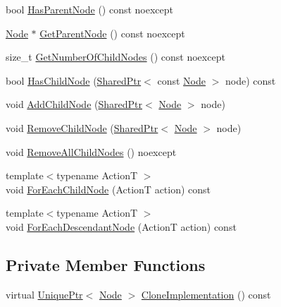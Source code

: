 \begin{DoxyCompactItemize}
\item 
bool \hyperlink{classmage_1_1_node_acc47eb0f2eaa60e71fd945e79b4f622d}{Has\+Parent\+Node} () const noexcept
\item 
\hyperlink{classmage_1_1_node}{Node} $\ast$ \hyperlink{classmage_1_1_node_a21ba704ed3af4c80d096ad5f393da8e0}{Get\+Parent\+Node} () const noexcept
\item 
size\+\_\+t \hyperlink{classmage_1_1_node_ab4fff9779c09d873abcf881b6ff85d9e}{Get\+Number\+Of\+Child\+Nodes} () const noexcept
\item 
bool \hyperlink{classmage_1_1_node_a1b8c2d933a281f7f815791db38c965ad}{Has\+Child\+Node} (\hyperlink{namespacemage_a1e01ae66713838a7a67d30e44c67703e}{Shared\+Ptr}$<$ const \hyperlink{classmage_1_1_node}{Node} $>$ node) const
\item 
void \hyperlink{classmage_1_1_node_a11a7c052c5e4a6713d60aaad67dfde5d}{Add\+Child\+Node} (\hyperlink{namespacemage_a1e01ae66713838a7a67d30e44c67703e}{Shared\+Ptr}$<$ \hyperlink{classmage_1_1_node}{Node} $>$ node)
\item 
void \hyperlink{classmage_1_1_node_a0da235c6459c315ad1c4be5c7aa7c7f0}{Remove\+Child\+Node} (\hyperlink{namespacemage_a1e01ae66713838a7a67d30e44c67703e}{Shared\+Ptr}$<$ \hyperlink{classmage_1_1_node}{Node} $>$ node)
\item 
void \hyperlink{classmage_1_1_node_a7627e4e280fc9dd13d255c0f64eba79e}{Remove\+All\+Child\+Nodes} () noexcept
\item 
{\footnotesize template$<$typename ActionT $>$ }\\void \hyperlink{classmage_1_1_node_afedb523a462952ec29aed7504d0a71d4}{For\+Each\+Child\+Node} (ActionT action) const
\item 
{\footnotesize template$<$typename ActionT $>$ }\\void \hyperlink{classmage_1_1_node_a86668c371e1452204b52f2896cbb16fd}{For\+Each\+Descendant\+Node} (ActionT action) const
\end{DoxyCompactItemize}
\subsection*{Private Member Functions}
\begin{DoxyCompactItemize}
\item 
virtual \hyperlink{namespacemage_a3316d7143a973e37adf1110f2e80ca31}{Unique\+Ptr}$<$ \hyperlink{classmage_1_1_node}{Node} $>$ \hyperlink{classmage_1_1_node_a71a4763bfd4cba5653488b490e61dc8f}{Clone\+Implementation} () const
\end{DoxyCompactItemize}
